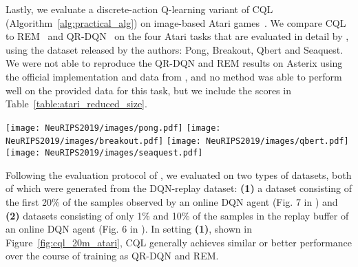 Lastly, we evaluate a discrete-action Q-learning variant of CQL (Algorithm~\ref{alg:practical_alg}) on image-based Atari games~\citep{bellemare2013arcade}. We compare CQL to REM~\citep{agarwal2019optimistic} and QR-DQN~\citep{dabney2018distributional} on the four Atari tasks that are evaluated in detail by \citet{agarwal2019optimistic}, using the dataset released by the authors: Pong, Breakout, Qbert and Seaquest. We were not able to reproduce the QR-DQN and REM results on Asterix using the official implementation and data from \citet{agarwal2019optimistic}, and no method was able to perform well on the provided data for this task, but we include the scores in Table~\ref{table:atari_reduced_size}.
\begin{figure*}[h]
\vspace{-10pt}
  \texttt{[image: NeuRIPS2019/images/pong.pdf]}  
  \texttt{[image: NeuRIPS2019/images/breakout.pdf]}  
  \texttt{[image: NeuRIPS2019/images/qbert.pdf]}  
  \texttt{[image: NeuRIPS2019/images/seaquest.pdf]}  
\caption{\label{fig:cql_20m_atari}{\footnotesize Performance of CQL, QR-DQN and REM as a function of training steps (x-axis) in setting \textbf{(2)} when provided with only the first 20\% of the samples of an online DQN run. Note that CQL is able to learn stably on 3 out of 4 games, and its performance does not degrade as steeply as QR-DQN on Seaquest.}}
\vspace{-10pt}
\end{figure*}
Following the evaluation protocol of \citet{agarwal2019optimistic}, we evaluated on two types of datasets, both of which were generated from the DQN-replay dataset:
\textbf{(1)} a dataset consisting of the first 20\% of the samples observed by an online DQN agent (Fig. 7 in \citep{agarwal2019optimistic}) and 
\textbf{(2)} datasets consisting of only 1\%  and 10\% of the samples in the replay buffer of an online DQN agent (Fig. 6 in \citep{agarwal2019optimistic}). In setting \textbf{(1)}, shown in Figure~\ref{fig:cql_20m_atari}, CQL generally achieves similar or better performance over the course of training as QR-DQN and REM.
